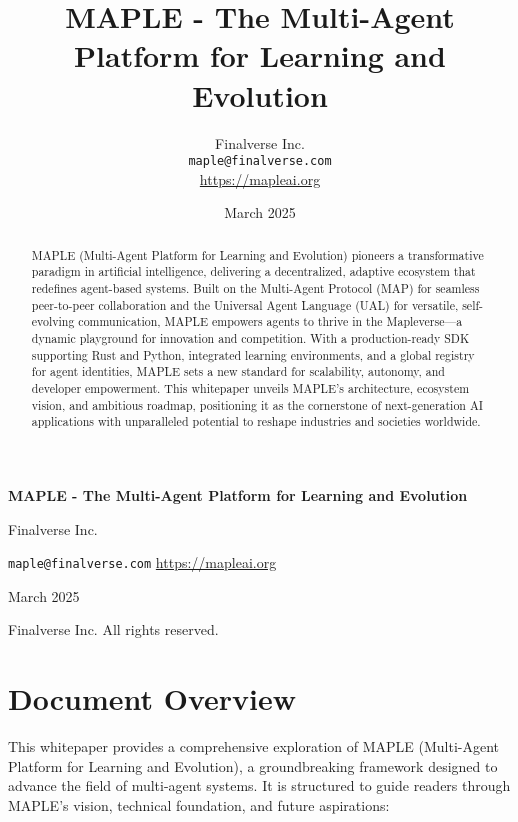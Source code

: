 \documentclass[a4paper,11pt]{article}
\title{\textbf{MAPLE - The Multi-Agent Platform for Learning and Evolution}}
\author{Finalverse Inc. \\ \texttt{maple@finalverse.com} \\ \url{https://mapleai.org}}
\date{March 2025}
\begin{document}
\begin{titlepage}
    \centering
    \vspace*{1cm}
    {\Huge \textbf{MAPLE - The Multi-Agent Platform for Learning and Evolution}\par}
    \vspace{2cm}
    {\Large Finalverse Inc.\par}
    \vspace{0.5cm}
    {\normalsize \texttt{maple@finalverse.com} \quad \url{https://mapleai.org}\par}
    \vspace{2cm}
    {\large March 2025\par}
    \vspace{1cm}
    {\small {} Finalverse Inc. All rights reserved.\par}
\end{titlepage}

\begin{abstract}
MAPLE (Multi-Agent Platform for Learning and Evolution) pioneers a transformative paradigm in artificial intelligence, delivering a decentralized, adaptive ecosystem that redefines agent-based systems. Built on the Multi-Agent Protocol (MAP) for seamless peer-to-peer collaboration and the Universal Agent Language (UAL) for versatile, self-evolving communication, MAPLE empowers agents to thrive in the Mapleverse—a dynamic playground for innovation and competition. With a production-ready SDK supporting Rust and Python, integrated learning environments, and a global registry for agent identities, MAPLE sets a new standard for scalability, autonomy, and developer empowerment. This whitepaper unveils MAPLE’s architecture, ecosystem vision, and ambitious roadmap, positioning it as the cornerstone of next-generation AI applications with unparalleled potential to reshape industries and societies worldwide.
\end{abstract}

\tableofcontents
\pagebreak

\section{Document Overview}
This whitepaper provides a comprehensive exploration of MAPLE (Multi-Agent Platform for Learning and Evolution), a groundbreaking framework designed to advance the field of multi-agent systems. It is structured to guide readers through MAPLE’s vision, technical foundation, and future aspirations:
\end{document}
